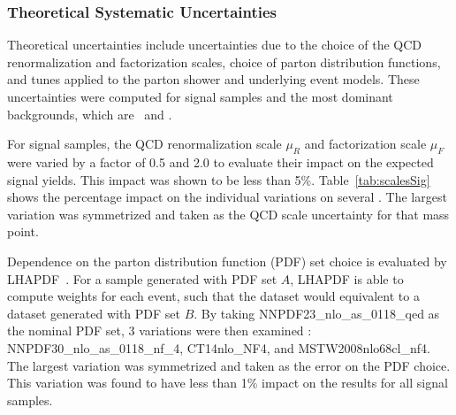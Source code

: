 \subsubsection{Theoretical Systematic Uncertainties}
\par Theoretical uncertainties include uncertainties due to the choice of the QCD renormalization
 and factorization scales, choice of parton distribution functions, and tunes applied to the parton 
shower and underlying event models. These uncertainties were computed for signal samples and the most 
dominant backgrounds, which are \ttbar\ and \Wjets.    

\par For signal samples, the QCD renormalization scale $\mu_R$ and factorization scale $\mu_F$ were 
varied by a factor of 0.5 and 2.0 to evaluate their impact on the expected signal yields. 
This impact was shown to be less than 5\%. Table~\ref{tab:scalesSig} shows the percentage impact 
on the individual variations on several \mcH.  The largest variation was symmetrized and 
taken as the QCD scale uncertainty for that mass point.  

\begin{table}[!h]
\begin{center}
\end{center}
\caption{Theoretical systematic uncertainties on the signal acceptance (in \%) due to the QCD scale. 
The factorization scales are varied by a factor of 2 for up and down variations.}
\label{tab:scalesSig}
\end{table}

\par Dependence on the parton distribution function (PDF) set choice is evaluated by LHAPDF~\cite{Buckley:2014ana}. 
For a sample generated with PDF set $A$, LHAPDF is able to compute weights for each event, such that
the dataset would equivalent to a dataset generated with PDF set $B$. By taking NNPDF23\_nlo\_as\_0118\_qed 
 as the nominal PDF set, 3 variations were then examined : NNPDF30\_nlo\_as\_0118\_nf\_4, 
CT14nlo\_NF4, and MSTW2008nlo68cl\_nf4. The largest variation was symmetrized and taken as the error 
on the PDF choice. This variation was found to have less than 1\% impact on the results 
for all signal samples.  

